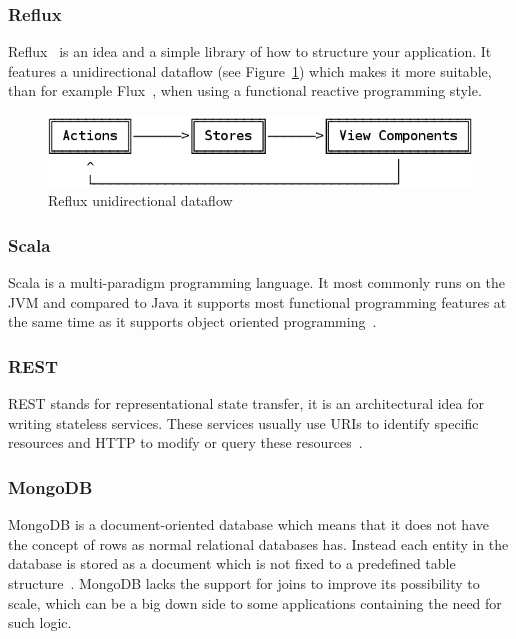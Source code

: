 \documentclass[a4paper,12pt]{article}
\begin{document}
\subsubsection{Reflux}
Reflux~\cite{REFLUX} is an idea and a simple library of how to structure your application. It
features a unidirectional dataflow (see Figure~\ref{fig:reflux}) which makes it more suitable, than
for example Flux~\cite{FLUX}, when using a functional reactive programming style.

\begin{figure}[htp] 
    \centering
    \includegraphics[scale=0.4]{reflux.png}
    \caption{Reflux unidirectional dataflow}
    \label{fig:reflux}
\end{figure}

\subsubsection{Scala} 
Scala is a multi-paradigm programming language. It most commonly runs on the JVM and compared to
Java it supports most functional programming features at the same time as it supports object
oriented programming~\cite{SCALA}.  

\subsubsection{REST} 
REST stands for representational state transfer, it is an architectural idea for writing stateless
services. These services usually use URIs to identify specific resources and HTTP to modify or query
these resources~\cite{REST}. 

\subsubsection{MongoDB}
MongoDB is a document-oriented database which means that it does not have the concept of rows as
normal relational databases has. Instead each entity in the database is stored as a document which
is not fixed to a predefined table structure~\cite{MONGODB}. MongoDB lacks the support for joins to
improve its possibility to scale, which can be a big down side to some applications containing the
need for such logic.
\end{document}
